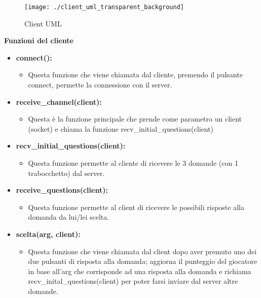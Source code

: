 
\begin{figure}[p] %
	\centering
	\texttt{[image: ./client\_uml\_transparent\_background]}
	\caption{Client UML}
	\label{fig:client_uml}
\end{figure}


\textbf{\large Funzioni del cliente}
\begin{itemize}
	\item \textbf{\normalsize connect():}
	\begin{itemize}
		\item \textsf{\normalsize Questa funzione che viene chiamata dal cliente, premendo il pulsante connect, permette la connessione con il server.}
	\end{itemize}
	\item \textbf{\normalsize receive\_channel(client): }
	\begin{itemize}
		\item \textsf{\normalsize Questa è la funzione principale che prende come parametro un client (socket) e chiama la funzione recv\_initial\_questions(client)}
	\end{itemize}
	\item \textbf{\normalsize recv\_initial\_questions(client): }
	\begin{itemize}
		\item \textsf{\normalsize Questa funzione permette al cliente di ricevere le 3 domande (con 1 trabocchetto) dal server.}
	\end{itemize}
	\item \textbf{\normalsize receive\_questions(client): }
	\begin{itemize}
		\item \textsf{\normalsize Questa funzione permette al client di ricevere le possibili risposte alla domanda da lui/lei scelta.}
	\end{itemize}
	\item \textbf{\normalsize scelta(arg, client):}
	\begin{itemize}
		\item \textsf{\normalsize Questa funzione che viene chiamata dal client dopo aver premuto uno dei due pulsanti di risposta alla domanda; aggiorna il punteggio del giocatore in base all'arg che corrisponde ad una risposta alla domanda  e richiama recv\_inital\_questions(client) per poter farsi inviare dal server altre domande.}

\end{itemize}
\end{itemize}
